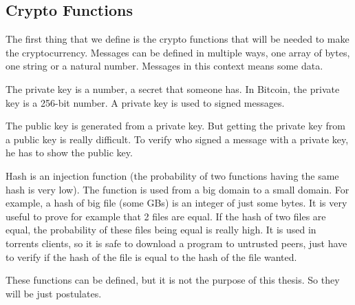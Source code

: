 \subsection{Crypto Functions}
The first thing that we define is the crypto functions that will be needed to make the cryptocurrency.
Messages can be defined in multiple ways, one array of bytes, one string or a natural number.
Messages in this context means some data.

The private key is a number, a secret that someone has.
In Bitcoin, the private key is a 256-bit number.
A private key is used to signed messages.

The public key is generated from a private key.
But getting the private key from a public key is really difficult.
To verify who signed a message with a private key, he has to show the public key.

Hash is an injection function (the probability of two functions having the same hash is very low).
The function is used from a big domain to a small domain.
For example, a hash of big file (some GBs) is an integer of just some bytes.
It is very useful to prove for example that 2 files are equal.
If the hash of two files are equal, the probability of these files being equal is really high.
It is used in torrents clients, so it is safe to download a program to untrusted peers,
just have to verify if the hash of the file is equal to the hash of the file wanted.

These functions can be defined, but it is not the purpose of this thesis.
So they will be just postulates.


